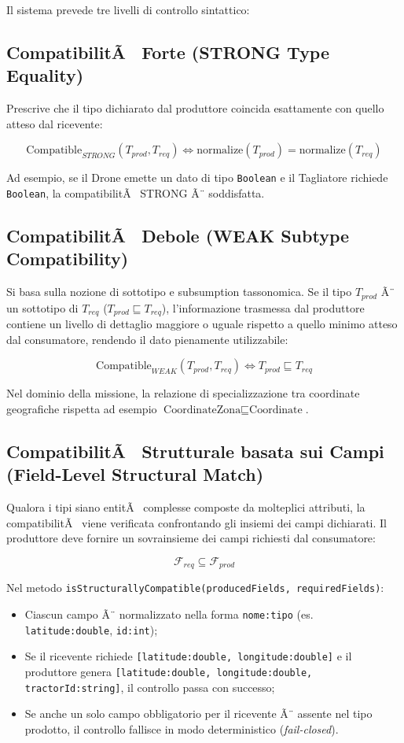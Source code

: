 ﻿\documentclass[11pt, a4paper]{report}
\begin{document}
Il sistema prevede tre livelli di controllo sintattico:

\subsection{CompatibilitÃ  Forte (STRONG Type Equality)}
Prescrive che il tipo dichiarato dal produttore coincida esattamente con quello atteso dal ricevente:

$$\text{Compatible}_{STRONG}(T_{prod}, T_{req}) \iff \text{normalize}(T_{prod}) = \text{normalize}(T_{req})$$

Ad esempio, se il Drone emette un dato di tipo \texttt{Boolean} e il Tagliatore richiede \texttt{Boolean}, la compatibilitÃ  STRONG Ã¨ soddisfatta.

\subsection{CompatibilitÃ  Debole (WEAK Subtype Compatibility)}
Si basa sulla nozione di sottotipo e subsumption tassonomica. Se il tipo $T_{prod}$ Ã¨ un sottotipo di $T_{req}$ ($T_{prod} \sqsubseteq T_{req}$), l'informazione trasmessa dal produttore contiene un livello di dettaglio maggiore o uguale rispetto a quello minimo atteso dal consumatore, rendendo il dato pienamente utilizzabile:

$$\text{Compatible}_{WEAK}(T_{prod}, T_{req}) \iff T_{prod} \sqsubseteq T_{req}$$

Nel dominio della missione, la relazione di specializzazione tra coordinate geografiche rispetta ad esempio $\text{CoordinateZona} \sqsubseteq \text{Coordinate}$.

\subsection{CompatibilitÃ  Strutturale basata sui Campi (Field-Level Structural Match)}
Qualora i tipi siano entitÃ  complesse composte da molteplici attributi, la compatibilitÃ  viene verificata confrontando gli insiemi dei campi dichiarati. Il produttore deve fornire un sovrainsieme dei campi richiesti dal consumatore:

$$\mathcal{F}_{req} \subseteq \mathcal{F}_{prod}$$

Nel metodo \texttt{isStructurallyCompatible(producedFields, requiredFields)}:
\begin{itemize}
    \item Ciascun campo Ã¨ normalizzato nella forma \texttt{nome:tipo} (es. \texttt{latitude:double}, \texttt{id:int});
    \item Se il ricevente richiede \texttt{[latitude:double, longitude:double]} e il produttore genera \texttt{[latitude:double, longitude:double, tractorId:string]}, il controllo passa con successo;
    \item Se anche un solo campo obbligatorio per il ricevente Ã¨ assente nel tipo prodotto, il controllo fallisce in modo deterministico (\textit{fail-closed}).
\end{itemize}
\end{document}
